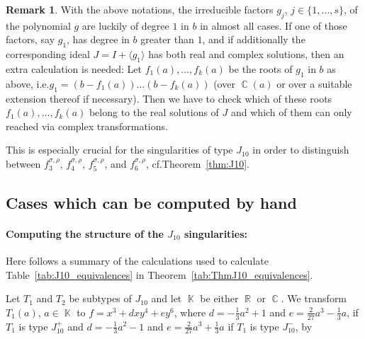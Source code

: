 \documentclass[noend]{amsproc}
\theoremstyle{definition}
\newtheorem{remark}[theorem]{Remark}
\DeclareMathOperator{\R}{\mathbb{R}}
\DeclareMathOperator{\C}{\mathbb{C}}
\DeclareMathOperator{\K}{\mathbb{K}}
\begin{document}
\begin{remark}
With the above notations, the irreducible factors $g_j$,
$j \in \{1,\ldots,s\}$, of the polynomial $g$ are luckily of degree $1$ in $b$
in almost all cases. If one of those factors, say $g_1$, has degree in $b$
greater than $1$, and if additionally the corresponding ideal $J = I + \langle
g_1 \rangle$ has both real and complex solutions, then an extra calculation is
needed: Let $f_1(a), \ldots, f_k(a)$ be the roots of $g_1$ in $b$ as above,
i.e.\@ $g_1 = (b-f_1(a)) \ldots (b-f_k(a))$ (over $\C(a)$ or over a suitable
extension thereof if necessary). Then we have to check which of these roots
$f_1(a), \ldots, f_k(a)$ belong to the real solutions of $J$ and which of them
can only reached via complex transformations.

This is especially crucial for the singularities of type $J_{10}$ in order to
distinguish between $f_3^{\sigma,\rho}$, $f_4^{\sigma,\rho}$,
$f_5^{\sigma,\rho}$, and $f_6^{\sigma,\rho}$, cf.\@ Theorem~\ref{thm:J10}.
\end{remark}


\subsection{Cases which can be computed by hand}

\paragraph{\bf Computing the structure of the $J_{10}$ singularities:}Here
follows a summary of the calculations used to calculate
Table~\ref{tab:J10_equivalences} in Theorem~\ref{tab:ThmJ10_equivalences}.

Let $T_1$ and $T_2$ be subtypes of $J_{10}$ and let $\K$ be either $\R$ or
$\C$. We transform $T_1(a)$, $a\in\K$ to $f=x^3+dxy^4+ey^6$, where
$d=-\frac{1}{3}a^2+1$ and $e=\frac{2}{27}a^3-\frac{1}{3}a$, if $T_1$ is type
$J_{10}^+$ and $d=-\frac{1}{3}a^2-1$ and $e=\frac{2}{27}a^3+\frac{1}{3}a$ if
$T_1$ is type $J_{10}^-$, by
\end{document}
